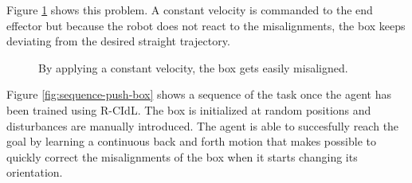  Figure \ref{fig:planar-motion-problem} shows this problem. A constant velocity is commanded to the end effector but because the robot does not react to the misalignments, the box keeps deviating from the desired straight trajectory.


 \begin{figure}[H]
  \centering
  \hspace*{\fill}%
   \hfill
   \hfill
   \hspace*{\fill}%
  \caption{By applying a constant velocity, the box gets easily misaligned.}
  \label{fig:planar-motion-problem}
\end{figure}

Figure \ref{fig:sequence-push-box} shows a sequence of the task once the agent has been trained using R-CIdL. The box is initialized at random positions and disturbances are manually introduced. The agent is able to succesfully reach the goal by learning a continuous back and forth motion that makes possible to quickly correct the misalignments of the box when it starts changing its orientation.

